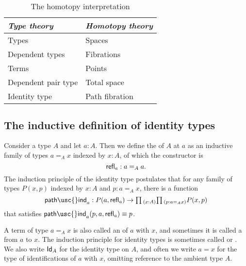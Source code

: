\begin{table}
\begin{center}
\caption{\label{tab:homotopy_interpretation}The homotopy interpretation}
\begin{tabular}{ll}
\toprule
\emph{Type theory} &  \emph{Homotopy theory} \\
\midrule
Types  & Spaces \\
Dependent types & Fibrations \\
Terms & Points \\
Dependent pair type & Total space \\
Identity type & Path fibration\\
\bottomrule
\end{tabular}
\end{center}
\end{table}

\subsection{The inductive definition of identity types}

\begin{defn}
  Consider a type $A$ and let $a:A$. Then we define the  of $A$ at $a$ as an inductive family of types $a =_A x$ indexed by $x:A$, of which the constructor is
  \begin{equation*}
    \mathsf{refl}_{a}:a=_Aa.
  \end{equation*}
  The induction principle of the identity type postulates that for any family of types $P(x,p)$ indexed by $x:A$ and $p:a=_A x$, there is a function
  \begin{equation*}
    \mathsf{path\usc{}ind}_a:P(a,\refl{a}) \to \prd{x:A}{p:a=_A x} P(x,p)
  \end{equation*}
  that satisfies $\mathsf{path\usc{}ind}_a(p,a,\refl{a})\jdeq p$.

  A term of type $a=_A x$ is also called an  of $a$ with $x$, and sometimes it is called a  from $a$ to $x$.
The induction principle for identity types is sometimes called  or . We also write $\mathsf{Id}_{A}$ for the identity type on $A$, and often we write $a=x$ for the type of identifications of $a$ with $x$, omitting reference to the ambient type $A$.
\end{defn}

